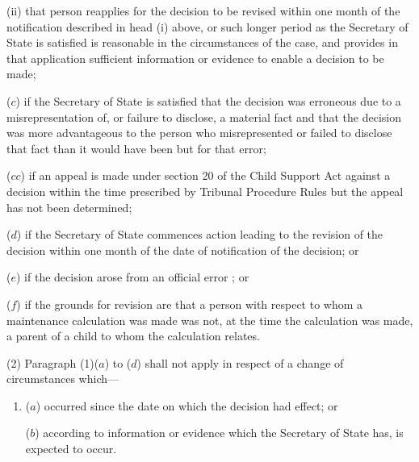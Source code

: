 \documentclass[12pt,a4paper]{article}
\begin{document}
\begin{enumerate}
\begin{enumerate}
(ii) that person reapplies for the decision to be revised within one month of the notification described in head (i)  above, or such longer period as the 
Secretary of State  %
is satisfied is reasonable in the circumstances of the case, and provides in that application sufficient information or evidence to enable a decision to be made;
\end{enumerate}

($c$) if 
the Secretary of State  %
is satisfied that the decision was erroneous due to a misrepresentation of, or failure to disclose, a material fact and that the decision was more advantageous to the person who misrepresented or failed to disclose that fact than it would have been but for that error;

($cc$) if an appeal is made under section 20 of the Child Support Act against a decision within the time prescribed 
by Tribunal Procedure Rules  %
but the appeal has not been determined;

($d$) if 
the Secretary of State  %
commences action leading to the revision of the decision within one month of the date of notification of the decision; or

($e$) if the decision arose from an official error%
%
; or

    ($f$) 
    if the grounds for revision are that a person with respect to whom a maintenance calculation was made was not, at the time the calculation was made, a parent of a child to whom the calculation relates.
\end{enumerate}

(2) Paragraph (1)($a$)  to ($d$)  shall not apply in respect of a change of circumstances which—
\begin{enumerate}\item[]
($a$) occurred since the date on which the decision had effect; or

($b$) according to information or evidence which the 
Secretary of State  %
has, is expected to occur.
\end{enumerate}
\end{document}
